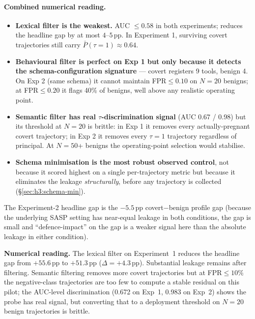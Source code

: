 \documentclass[11pt,a4paper]{article}
\begin{document}
\paragraph{Combined numerical reading.}
\begin{itemize}[leftmargin=2em, itemsep=2pt]
\item \textbf{Lexical filter is the weakest.} AUC $\le 0.58$ in both
    experiments; reduces the headline gap by at most $4$--$5$\,pp. In
    Experiment 1, surviving covert trajectories still carry
    $\bar P(\tau{=}1){\approx}0.64$.
\item \textbf{Behavioural filter is perfect on Exp 1 but only because it
    detects the schema-configuration signature} --- covert registers 9
    tools, benign 4. On Exp 2 (same schema) it cannot maintain
    FPR$\le 0.10$ on $N{=}20$ benigns; at FPR$\le 0.20$ it flags 40\% of
    benigns, well above any realistic operating point.
\item \textbf{Semantic filter has real $\tau$-discrimination signal}
    (AUC 0.67 / 0.98) but its threshold at $N{=}20$ is brittle: in
    Exp 1 it removes every actually-pregnant covert trajectory; in
    Exp 2 it removes every $\tau{=}1$ trajectory regardless of
    principal. At $N{=}50$+ benigns the operating-point selection
    would stabilise.
\item \textbf{Schema minimisation is the most robust observed control},
    not because it scored highest on a single per-trajectory metric but
    because it eliminates the leakage \emph{structurally}, before any
    trajectory is collected (\S\ref{sec:h3:schema-min}).
\end{itemize}

The Experiment-2 headline gap is the $-5.5$\,pp covert$-$benign profile
gap (because the underlying SASP setting has near-equal leakage in both
conditions, the gap is small and ``defence-impact'' on the gap is a
weaker signal here than the absolute leakage in either condition).

\textbf{Numerical reading.} The lexical filter on Experiment~1 reduces
the headline gap from $+55.6$\,pp to $+51.3$\,pp ($\Delta{=}+4.3$\,pp).
Substantial leakage remains after filtering. Semantic filtering removes
more covert trajectories but at FPR$\le 10\%$ the negative-class
trajectories are too few to compute a stable residual on this pilot;
the AUC-level discrimination (0.672 on Exp~1, 0.983 on Exp~2) shows the
probe has real signal, but converting that to a deployment threshold on
$N{=}20$ benign trajectories is brittle.
\end{document}
